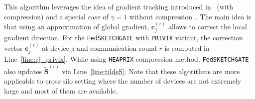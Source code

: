 \documentclass[twoside]{article}
\begin{document}
This algorithm leverages the idea of gradient tracking introduced in~\cite{haddadpour2020federated} (with compression) and a special case of $\gamma=1$ without compression~\cite{liang2019variance}. 
The main idea is that using an approximation of global gradient, $\mathbf{c}_j^{(r)}$ allows to correct the local gradient direction. 
For the \texttt{FedSKETCHGATE} with \texttt{PRIVIX} variant, the correction vector $\mathbf{c}_j^{(r)}$ at device $j$ and communication round $r$ is computed in Line~\ref{line:cj_privix}. 
While using \texttt{HEAPRIX} compression method, \texttt{FedSKETCHGATE} also updates $\tilde{\mathbf{S}}^{(r)}$ via Line~\ref{line:tildeS}.
Note that these algorithms are more applicable to cross-silo setting where the number of devices are not extremely large and most of them are available.
\end{document}
